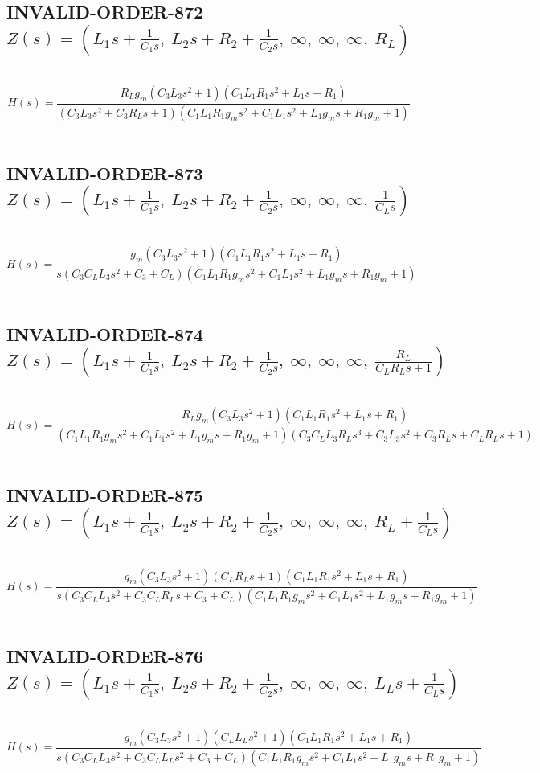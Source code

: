 \documentclass{article}
\begin{document}
\subsection{INVALID-ORDER-872 $Z(s) = \left( L_{1} s + \frac{1}{C_{1} s}, \  L_{2} s + R_{2} + \frac{1}{C_{2} s}, \  \infty, \  \infty, \  \infty, \  R_{L}\right)$ } \ 
\textbf{\[H(s) = \frac{R_{L} g_{m} \left(C_{3} L_{3} s^{2} + 1\right) \left(C_{1} L_{1} R_{1} s^{2} + L_{1} s + R_{1}\right)}{\left(C_{3} L_{3} s^{2} + C_{3} R_{L} s + 1\right) \left(C_{1} L_{1} R_{1} g_{m} s^{2} + C_{1} L_{1} s^{2} + L_{1} g_{m} s + R_{1} g_{m} + 1\right)}\] } \ 
\subsection{INVALID-ORDER-873 $Z(s) = \left( L_{1} s + \frac{1}{C_{1} s}, \  L_{2} s + R_{2} + \frac{1}{C_{2} s}, \  \infty, \  \infty, \  \infty, \  \frac{1}{C_{L} s}\right)$ } \ 
\textbf{\[H(s) = \frac{g_{m} \left(C_{3} L_{3} s^{2} + 1\right) \left(C_{1} L_{1} R_{1} s^{2} + L_{1} s + R_{1}\right)}{s \left(C_{3} C_{L} L_{3} s^{2} + C_{3} + C_{L}\right) \left(C_{1} L_{1} R_{1} g_{m} s^{2} + C_{1} L_{1} s^{2} + L_{1} g_{m} s + R_{1} g_{m} + 1\right)}\] } \ 
\subsection{INVALID-ORDER-874 $Z(s) = \left( L_{1} s + \frac{1}{C_{1} s}, \  L_{2} s + R_{2} + \frac{1}{C_{2} s}, \  \infty, \  \infty, \  \infty, \  \frac{R_{L}}{C_{L} R_{L} s + 1}\right)$ } \ 
\textbf{\[H(s) = \frac{R_{L} g_{m} \left(C_{3} L_{3} s^{2} + 1\right) \left(C_{1} L_{1} R_{1} s^{2} + L_{1} s + R_{1}\right)}{\left(C_{1} L_{1} R_{1} g_{m} s^{2} + C_{1} L_{1} s^{2} + L_{1} g_{m} s + R_{1} g_{m} + 1\right) \left(C_{3} C_{L} L_{3} R_{L} s^{3} + C_{3} L_{3} s^{2} + C_{3} R_{L} s + C_{L} R_{L} s + 1\right)}\] } \ 
\subsection{INVALID-ORDER-875 $Z(s) = \left( L_{1} s + \frac{1}{C_{1} s}, \  L_{2} s + R_{2} + \frac{1}{C_{2} s}, \  \infty, \  \infty, \  \infty, \  R_{L} + \frac{1}{C_{L} s}\right)$ } \ 
\textbf{\[H(s) = \frac{g_{m} \left(C_{3} L_{3} s^{2} + 1\right) \left(C_{L} R_{L} s + 1\right) \left(C_{1} L_{1} R_{1} s^{2} + L_{1} s + R_{1}\right)}{s \left(C_{3} C_{L} L_{3} s^{2} + C_{3} C_{L} R_{L} s + C_{3} + C_{L}\right) \left(C_{1} L_{1} R_{1} g_{m} s^{2} + C_{1} L_{1} s^{2} + L_{1} g_{m} s + R_{1} g_{m} + 1\right)}\] } \ 
\subsection{INVALID-ORDER-876 $Z(s) = \left( L_{1} s + \frac{1}{C_{1} s}, \  L_{2} s + R_{2} + \frac{1}{C_{2} s}, \  \infty, \  \infty, \  \infty, \  L_{L} s + \frac{1}{C_{L} s}\right)$ } \ 
\textbf{\[H(s) = \frac{g_{m} \left(C_{3} L_{3} s^{2} + 1\right) \left(C_{L} L_{L} s^{2} + 1\right) \left(C_{1} L_{1} R_{1} s^{2} + L_{1} s + R_{1}\right)}{s \left(C_{3} C_{L} L_{3} s^{2} + C_{3} C_{L} L_{L} s^{2} + C_{3} + C_{L}\right) \left(C_{1} L_{1} R_{1} g_{m} s^{2} + C_{1} L_{1} s^{2} + L_{1} g_{m} s + R_{1} g_{m} + 1\right)}\] } \ 
\end{document}
